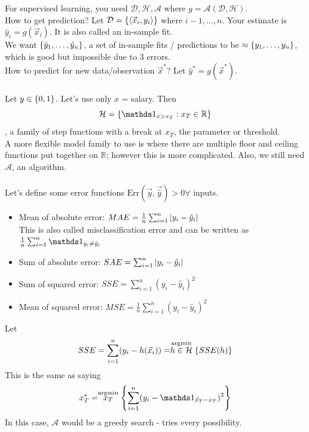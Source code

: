 \documentclass[12pt]{article}
\begin{document}
For supervised learning, you need $\mathcal{D}, \mathcal{H}, \mathcal{A}$ where $g = \mathcal{A}(\mathcal{D}, \mathcal{H})$. \\
How to get prediction? Let $\mathcal{D} = \left\{ \langle \vec{x}_i, y_i \rangle \right\}$ where $ i - 1, \dots, n$. Your estimate is $\hat{y}_i = g(\vec{x}_i)$. It is also called an in-sample fit. \\ 
We want $\left\{ \hat{y}_1, \dots, \hat{y}_n \right\}$, a set of in-sample fits / predictions to be $\approx \left\{ y_1,\dots, y_n \right\}$, which is good but impossible due to 3 errors. \\
How to predict for new data/observation $\vec{x}^*$? Let $\hat{y}^* = g(\vec{x}^*)$. \\~\\
Let $y \in \left\{ 0,1 \right\}$. Let's use only $x$ = salary. Then $$\mathcal{H} = \set{ \indicator{x > x_T}: x_T \in \mathbb{R}}$$, a family of step functions with a break at $x_T$, the parameter or threshold. \\ A more flexible model family to use is where there are multiple floor and ceiling functions put together on $\mathbb{R}$; however this is more complicated. Also, we still need $\mathcal{A}$, an algorithm. \\~\\
Let's define some error functions $\text{Err}(\vec{y}, \vec{\hat{y}}) > 0 \forall $ inputs. 
\begin{itemize} 
\item Mean of absolute error: $MAE = \frac{1}{n}\sum_{i=1}^n \abs{y_i - \hat{y}_i}$ \\
This is also called misclassification error and can be written as $\frac{1}{n} \sum_{i=1}^n \indicator{y_i \neq \hat{y}_i}$ 
\item Sum of absolute error: $SAE = \sum_{i=1}^n \abs{y_i - \hat{y}_i}$ 
\item Sum of squared error: $SSE = \sum_{i=1}^n (y_i - \hat{y}_i)^2$ 
\item Mean of squared error: $MSE = \frac{1}{n} \sum_{i=1}^n (y_i - \hat{y}_i)^2$ \end{itemize} 
Let $$SSE = \sum_{i = 1}^n (y_i - h(\vec{x}_i)) = \stackrel{\text{argmin}}{h \in \mathcal{H}} \left\{ SSE(h) \right\} $$ 
This is the same as saying $$ x_T^* = \argmin{x_T} \set{ \sum_{i=1}^n (y_i - \indicator{\vec{x}_T - x_T})^2}$$ In this case, $\mathcal{A}$ would be a greedy search - tries every possibility. \\~\\
\end{document}
